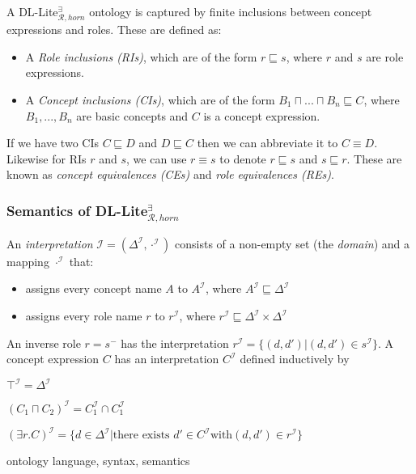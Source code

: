 A DL-Lite$_{\mathcal{R}, horn}^{\exists}$ ontology is captured by finite inclusions between concept expressions and roles. These are defined as: 
\begin{itemize}
    \setlength\itemsep{1em}
    \item A \emph{Role inclusions (RIs)}, which are of the form $r\sqsubseteq s$, where $r$ and $s$ are role expressions.
    \item A \emph{Concept inclusions (CIs)}, which are of the form $B_1 \sqcap ... \sqcap B_n \sqsubseteq C$, where $B_1, ..., B_n$ are basic concepts and $C$ is a concept expression.
\end{itemize}

If we have two CIs $C\sqsubseteq D$ and $D \sqsubseteq C$ then we can abbreviate it to $C \equiv D$. Likewise for RIs $r$ and $s$, we can use $r\equiv s$ to denote $r\sqsubseteq s$ and $s \sqsubseteq r$. These are known as \emph{concept equivalences (CEs)} and \emph{role equivalences (REs)}.

\subsubsection{Semantics of DL-Lite$_{\mathcal{R}, horn}^{\exists}$}
An \emph{interpretation} $\mathcal{I} = (\Delta^{\mathcal{I}}, \cdot^{\mathcal{I}})$ consists of a non-empty set (the \emph{domain}) and a mapping $\cdot^{\mathcal{I}}$ that:
\begin{itemize}
    \item assigns every concept name $A$ to $A^{\mathcal{I}}$, where $A^{\mathcal{I}}\sqsubseteq \Delta^{\mathcal{I}}$
    \item assigns every role name $r$ to  $r^{\mathcal{I}}$, where $r^{\mathcal{I}}\sqsubseteq \Delta^{\mathcal{I}}\times \Delta^{\mathcal{I}}$
\end{itemize}
An inverse role $r = s^-$ has the interpretation $r^{\mathcal{I}}=\{(d, d') | (d,d')\in s^{\mathcal{I}}\}$. A concept expression $C$ has an interpretation $C^{\mathcal{I}}$ defined inductively by
\begin{list}
    \item $ \top^{\mathcal{I}} = \Delta^{\mathcal{I}} $
    \item $ (C_{1} \sqcap C_{2})^{\mathcal{I}}= C_{1}^{\mathcal{I}} \cap C_{1}^{\mathcal{I}} $
    \item $ (\exists r.C)^{\mathcal{I}} = \{d\in \Delta ^{\mathcal{I}} | \text{there exists } d' \in C^{\mathcal{I}} \text{with} (d,d')\in r^{\mathcal{I}}\} $
\end{list}

ontology language, syntax, semantics
